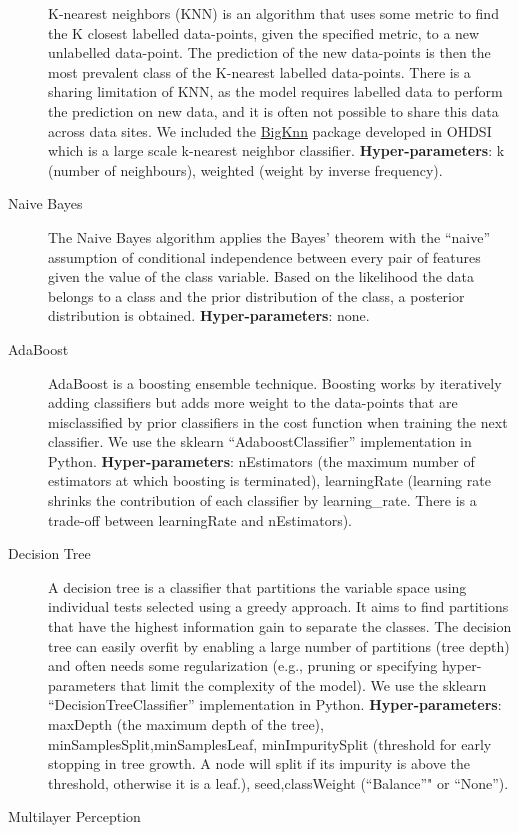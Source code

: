 \documentclass[11pt]{book}
\begin{document}
\begin{description}
K-nearest neighbors (KNN) is an algorithm that uses some metric to find
the K closest labelled data-points, given the specified metric, to a new
unlabelled data-point. The prediction of the new data-points is then the
most prevalent class of the K-nearest labelled data-points. There is a
sharing limitation of KNN, as the model requires labelled data to
perform the prediction on new data, and it is often not possible to
share this data across data sites. We included the
\href{https://github.com/OHDSI/BigKnn}{BigKnn} package developed in
OHDSI which is a large scale k-nearest neighbor classifier.
\textbf{Hyper-parameters}: k (number of neighbours), weighted (weight by
inverse frequency).
\item[Naive Bayes]
The Naive Bayes algorithm applies the Bayes' theorem with the ``naive''
assumption of conditional independence between every pair of features
given the value of the class variable. Based on the likelihood the data
belongs to a class and the prior distribution of the class, a posterior
distribution is obtained. \textbf{Hyper-parameters}: none.
\item[AdaBoost]
AdaBoost is a boosting ensemble technique. Boosting works by iteratively
adding classifiers but adds more weight to the data-points that are
misclassified by prior classifiers in the cost function when training
the next classifier. We use the sklearn ``AdaboostClassifier''
implementation in Python. \textbf{Hyper-parameters}: nEstimators (the
maximum number of estimators at which boosting is terminated),
learningRate (learning rate shrinks the contribution of each classifier
by learning\_rate. There is a trade-off between learningRate and
nEstimators).
\item[Decision Tree]
A decision tree is a classifier that partitions the variable space using
individual tests selected using a greedy approach. It aims to find
partitions that have the highest information gain to separate the
classes. The decision tree can easily overfit by enabling a large number
of partitions (tree depth) and often needs some regularization (e.g.,
pruning or specifying hyper-parameters that limit the complexity of the
model). We use the sklearn ``DecisionTreeClassifier'' implementation in
Python. \textbf{Hyper-parameters}: maxDepth (the maximum depth of the
tree), minSamplesSplit,minSamplesLeaf, minImpuritySplit (threshold for
early stopping in tree growth. A node will split if its impurity is
above the threshold, otherwise it is a leaf.), seed,classWeight
(``Balance''" or ``None'').
\item[Multilayer Perception]

\end{description}
\end{document}
